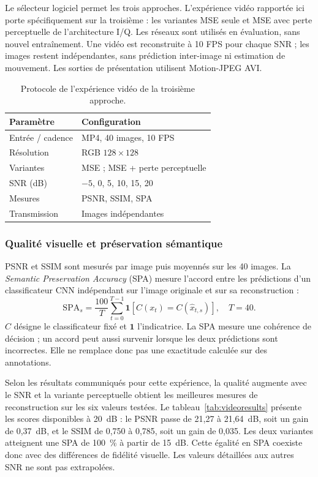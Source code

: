 \documentclass[conference]{IEEEtran}
\begin{document}
Le sélecteur logiciel permet les trois approches. L'expérience vidéo
rapportée ici porte spécifiquement sur la troisième : les variantes
MSE seule et MSE avec perte perceptuelle de l'architecture I/Q.
Les réseaux sont utilisés en évaluation, sans nouvel entraînement.
Une vidéo est reconstruite à 10 FPS pour chaque SNR ; les images
restent indépendantes, sans prédiction inter-image ni estimation de
mouvement. Les sorties de présentation utilisent Motion-JPEG AVI.

\begin{table}[!t]
\centering
\caption{Protocole de l'expérience vidéo de la troisième approche.}
\label{tab:video}
\begin{tabular}{ll}
\toprule
Paramètre & Configuration \\
\midrule
Entrée / cadence & MP4, 40 images, 10 FPS \\
Résolution & RGB $128\times128$ \\
Variantes & MSE ; MSE + perte perceptuelle \\
SNR (dB) & $-5$, 0, 5, 10, 15, 20 \\
Mesures & PSNR, SSIM, SPA \\
Transmission & Images indépendantes \\
\bottomrule
\end{tabular}
\end{table}

\subsubsection{Qualité visuelle et préservation sémantique}
PSNR et SSIM sont mesurés par image puis moyennés sur les
40 images. La \emph{Semantic Preservation Accuracy} (SPA) mesure
l'accord entre les prédictions d'un classificateur CNN indépendant
sur l'image originale et sur sa reconstruction :
\begin{equation}
\mathrm{SPA}_s=\frac{100}{T}\sum_{t=0}^{T-1}
\mathbf{1}\!\left[C(x_t)=C(\widehat{x}_{t,s})\right],\quad T=40.
\end{equation}
$C$ désigne le classificateur fixé et $\mathbf{1}$ l'indicatrice.
La SPA mesure une cohérence de décision ; un accord peut aussi
survenir lorsque les deux prédictions sont incorrectes. Elle ne
remplace donc pas une exactitude calculée sur des annotations.

Selon les résultats communiqués pour cette expérience, la qualité
augmente avec le SNR et la variante perceptuelle obtient les
meilleures mesures de reconstruction sur les six valeurs testées.
Le tableau~\ref{tab:videoresults} présente les scores disponibles
à 20~dB : le PSNR passe de 21,27 à 21,64~dB, soit un gain de
0,37~dB, et le SSIM de 0,750 à 0,785, soit un gain de 0,035.
Les deux variantes atteignent une SPA de 100~\% à partir de 15~dB.
Cette égalité en SPA coexiste donc avec des différences de fidélité
visuelle. Les valeurs détaillées aux autres SNR ne sont pas extrapolées.
\end{document}

